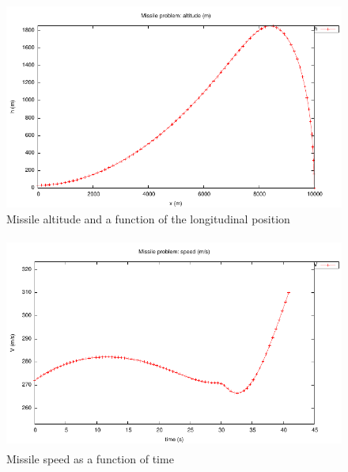 \documentclass[a4paper,11pt]{report}    %
\begin{document}
\begin{figure}[htbp]

 \centerline{\includegraphics{../examples/missile/missile_alt_vs_x}}
 \caption{Missile altitude and a function of the longitudinal position}\label{missile_alt_vs_x}
\end{figure}



\begin{figure}[htbp]
 \centerline{\includegraphics[height=7cm]{../examples/missile/missile_speed}}
\caption{Missile speed as a function of time}\label{missile_speed}
\end{figure}
\end{document}
